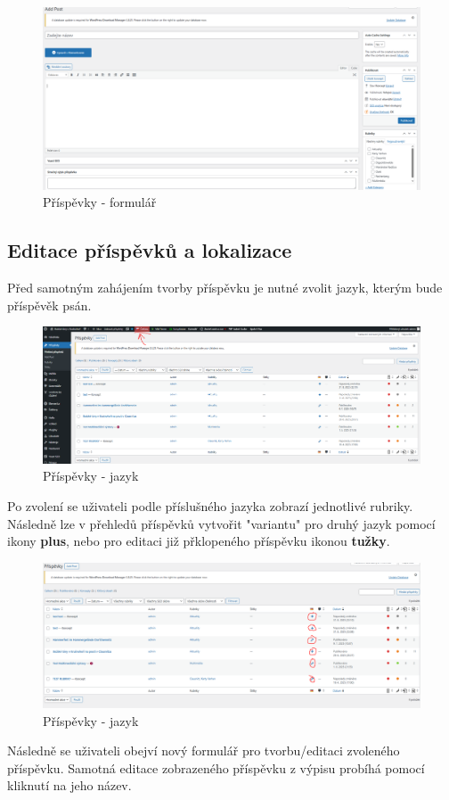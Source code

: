\documentclass[12pt,a4paper]{article}
\begin{document}
	\begin{figure}[htp]
		\centering
		\includegraphics[width=16cm]{WPnewpost.png}
		\caption{Příspěvky - formulář}
		\label{fig:role}
	\end{figure}
	
	\newpage
	\subsection{Editace příspěvků a lokalizace}
	
	Před samotným zahájením tvorby příspěvku je nutné zvolit jazyk, kterým bude příspěvěk psán.
	
	\begin{figure}[htp]
		\centering
		\includegraphics[width=15cm]{WPprispevkylang.png}
		\caption{Příspěvky - jazyk}
		\label{fig:role}
	\end{figure}
	
	Po zvolení se uživateli podle příslušného jazyka zobrazí jednotlivé rubriky. Následně lze v přehledů příspěvků vytvořit "variantu" pro druhý jazyk pomocí ikony \textbf{plus}, nebo pro editaci již přklopeného příspěvku ikonou \textbf{tužky}.
	
	\begin{figure}[htp]
		\centering
		\includegraphics[width=15cm]{WPeditprispevek.png}
		\caption{Příspěvky - jazyk}
		\label{fig:role}
	\end{figure}
	
	Následně se uživateli obejví nový formulář pro tvorbu/editaci zvoleného příspěvku. Samotná editace zobrazeného příspěvku z výpisu probíhá pomocí kliknutí na jeho název.
	
	
	

	
	
	
	
	
	
	
	
	
	
\end{document}
